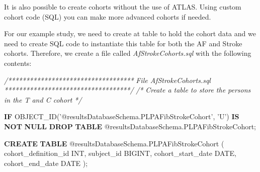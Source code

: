 \documentclass[
]{article}
\newenvironment{Shaded}{\begin{snugshade}}{\end{snugshade}}
\newcommand{\CommentTok}[1]{\textcolor[rgb]{0.56,0.35,0.01}{\textit{#1}}}
\newcommand{\ControlFlowTok}[1]{\textcolor[rgb]{0.13,0.29,0.53}{\textbf{#1}}}
\newcommand{\DataTypeTok}[1]{\textcolor[rgb]{0.13,0.29,0.53}{#1}}
\newcommand{\KeywordTok}[1]{\textcolor[rgb]{0.13,0.29,0.53}{\textbf{#1}}}
\newcommand{\NormalTok}[1]{#1}
\newcommand{\StringTok}[1]{\textcolor[rgb]{0.31,0.60,0.02}{#1}}
\begin{document}
It is also possible to create cohorts without the use of ATLAS. Using
custom cohort code (SQL) you can make more advanced cohorts if needed.

For our example study, we need to create at table to hold the cohort
data and we need to create SQL code to instantiate this table for both
the AF and Stroke cohorts. Therefore, we create a file called
\emph{AfStrokeCohorts.sql} with the following contents:

\begin{Shaded}
\begin{Highlighting}[]
\CommentTok{/***********************************}
\CommentTok{File AfStrokeCohorts.sql }
\CommentTok{***********************************/}
\CommentTok{/*}
\CommentTok{Create a table to store the persons in the T and C cohort}
\CommentTok{*/}

\ControlFlowTok{IF}\NormalTok{ OBJECT_ID(}\StringTok{'@resultsDatabaseSchema.PLPAFibStrokeCohort'}\NormalTok{, }\StringTok{'U'}\NormalTok{) }\KeywordTok{IS} \KeywordTok{NOT} \KeywordTok{NULL} 
\KeywordTok{DROP} \KeywordTok{TABLE}\NormalTok{ @resultsDatabaseSchema.PLPAFibStrokeCohort;}

\KeywordTok{CREATE} \KeywordTok{TABLE}\NormalTok{ @resultsDatabaseSchema.PLPAFibStrokeCohort }
\NormalTok{( }
\NormalTok{cohort_definition_id }\DataTypeTok{INT}\NormalTok{, }
\NormalTok{subject_id BIGINT,}
\NormalTok{cohort_start_date }\DataTypeTok{DATE}\NormalTok{, }
\NormalTok{cohort_end_date }\DataTypeTok{DATE}
\NormalTok{);}



\end{Highlighting}
\end{Shaded}
\end{document}
